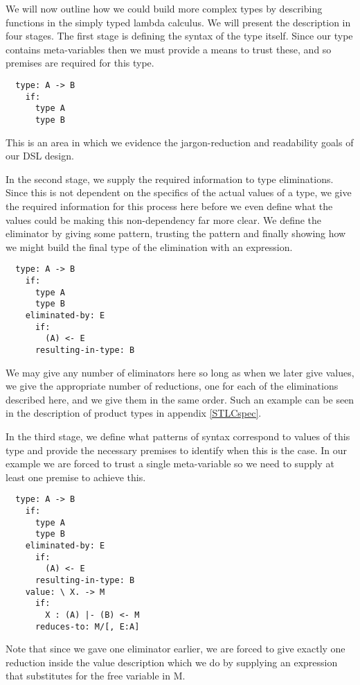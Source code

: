 We will now outline how we could build more complex types by
describing functions in the simply typed lambda calculus. We will
present the description in four stages. The first stage is defining
the syntax of the type itself. Since our type contains meta-variables
then we must provide a means to trust these, and so premises are
required for this type.

\begin{BVerbatim}
  type: A -> B
    if:
      type A
      type B
\end{BVerbatim}

This is an area in which we evidence the jargon-reduction and
readability goals of our DSL design.

In the second stage, we supply the required information to type
eliminations. Since this is not dependent on the specifics of the
actual values of a type, we give the required information for this
process here before we even define what the values could be making
this non-dependency far more clear. We define the eliminator by giving
some pattern, trusting the pattern and finally showing how we might
build the final type of the elimination with an expression.

\begin{BVerbatim}
  type: A -> B
    if:
      type A
      type B
    eliminated-by: E
      if:
        (A) <- E
      resulting-in-type: B
\end{BVerbatim}

We may give any number of eliminators here so long as when we later
give values, we give the appropriate number of reductions, one for
each of the eliminations described here, and we give them in the same
order. Such an example can be seen in the description of product types
in appendix \ref{STLCspec}.

In the third stage, we define what patterns of syntax correspond to
values of this type and provide the necessary premises to identify
when this is the case. In our example we are forced to trust a single
meta-variable so we need to supply at least one premise to achieve
this.

\begin{BVerbatim}
  type: A -> B
    if:
      type A
      type B
    eliminated-by: E
      if:
        (A) <- E
      resulting-in-type: B
    value: \ X. -> M
      if:
        X : (A) |- (B) <- M
      reduces-to: M/[, E:A]
\end{BVerbatim}

Note that since we gave one eliminator earlier, we are forced to give
exactly one reduction inside the value description which we do by
supplying an expression that substitutes for the free variable in M.

